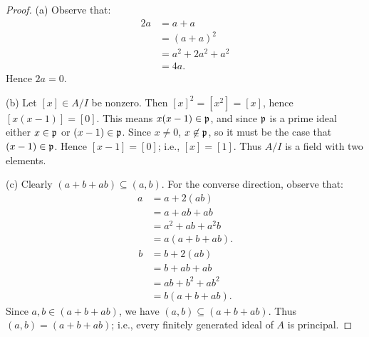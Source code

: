 \documentclass[11pt,twoside,openany]{memoir}
\begin{document}
    {\color{blue} \begin{proof}
        (a) Observe that:
            \begin{equation*}
            \begin{split}
                2a 
                & = a+a \\
                & = (a+a)^2 \\
                & = a^2 + 2a^2 + a^2 \\
                & = 4a.
            \end{split}
            \end{equation*}
        Hence $2a = 0$. 

        (b) Let $[x] \in A/I$ be nonzero. Then $[x]^2 = [x^2] = [x]$, hence $[x(x-1)] = [0]$. This means $x(x-1) \in \mathfrak{p}$, and since $\mathfrak{p}$ is a prime ideal either $x \in \mathfrak{p}$ or $(x-1) \in \mathfrak{p}$. Since $x \neq 0$, $x \not\in \mathfrak{p}$, so it must be the case that $(x-1) \in \mathfrak{p}$. Hence $[x-1] = [0]$; i.e., $[x] = [1]$. Thus $A/I$ is a field with two elements.

        (c) Clearly $(a+b+ab) \subseteq (a,b)$. For the converse direction, observe that:
            \begin{equation*}
            \begin{split}
                a
                & = a + 2(ab) \\
                & = a + ab + ab \\
                & = a^2 + ab + a^2b \\
                & = a(a+b+ab).
            \end{split}
            \end{equation*}
            \begin{equation*}
            \begin{split}
                b
                & = b + 2(ab) \\
                & = b + ab + ab \\
                & = ab + b^2 + ab^2 \\
                & = b(a+b+ab).
            \end{split}
            \end{equation*}
        Since $a,b \in (a+b+ab)$, we have $(a,b) \subseteq (a+b+ab)$. Thus $(a,b) = (a+b+ab)$; i.e., every finitely generated ideal of $A$ is principal.
    \end{proof}}
\end{document}
